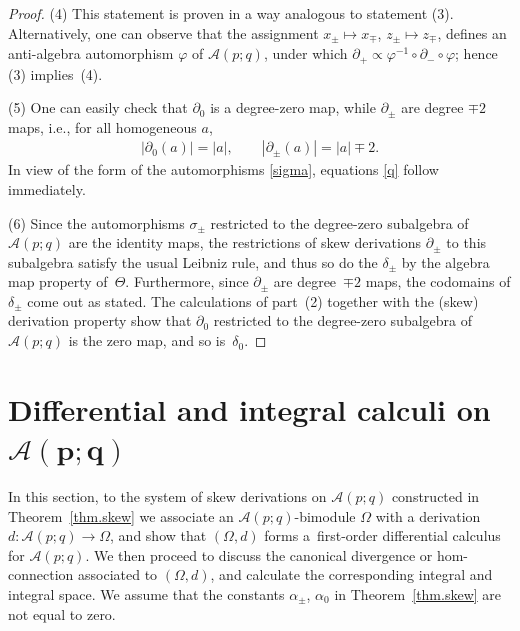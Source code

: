 \documentclass[10pt,a4paper]{amsart}
\numberwithin{equation}{section}
\def\AWeyl#1#2{{\mathcal{A}}(#1;#2)}
\begin{document}
\begin{proof}
(4) This statement is proven in a way analogous to statement (3). Alternatively, one can observe that the assignment $x_\pm \mapsto x_\mp$, $z_\pm\mapsto z_\mp$, def\/ines an anti-algebra automorphism $\varphi$ of ${\mathcal{A}}(p;q)$, under which $\partial_+ \propto \varphi^{-1}\circ \partial_-\circ \varphi$; hence (3) implies~(4).

(5) One can easily check that $\partial_0$ is a degree-zero map, while $\partial_\pm$ are degree $\mp 2$ maps, i.e., for all homogeneous $a$,
\begin{gather*}
|\partial_0(a)| = |a|, \qquad |\partial_\pm(a)| = |a|\mp 2.
\end{gather*}
In view of the form of the automorphisms \eqref{sigma}, equations \eqref{q} follow immediately.

(6) Since the automorphisms $\sigma_\pm$ restricted to the degree-zero subalgebra of $\AWeyl p q$ are the identity maps, the restrictions of skew derivations $\partial_\pm$ to this subalgebra satisfy the usual Leibniz rule, and thus so do the $\delta_\pm$ by the algebra map property of~$\Theta$. Furthermore, since $\partial_\pm$ are degree~$\mp 2$ maps, the codomains of $\delta_\pm$ come out as stated. The calculations of part~(2) together with the (skew) derivation property show that $\partial_0$ restricted to the degree-zero subalgebra of~$\AWeyl p q$ is the zero map, and so is~$\delta_0$.
\end{proof}

\section[Dif\/ferential and integral calculi on ${\mathcal A}(p;q)$]{Dif\/ferential and integral calculi on $\boldsymbol{\AWeyl p q}$}\label{sec.diff.a}
In this section, to the system of skew derivations on $\AWeyl p q$ constructed in Theorem~\ref{thm.skew} we associate an $\AWeyl p q$-bimodule $\Omega$ with a derivation $d\colon \AWeyl p q \to \Omega$, and show that $(\Omega, d)$ forms a~f\/irst-order dif\/ferential calculus for $\AWeyl p q$. We then proceed to discuss the canonical divergence or hom-connection associated to $(\Omega, d)$, and calculate the corresponding integral and integral space. We assume that the constants $\alpha_\pm$, $\alpha_0$ in Theorem~\ref{thm.skew} are not equal to zero.
\end{document}
